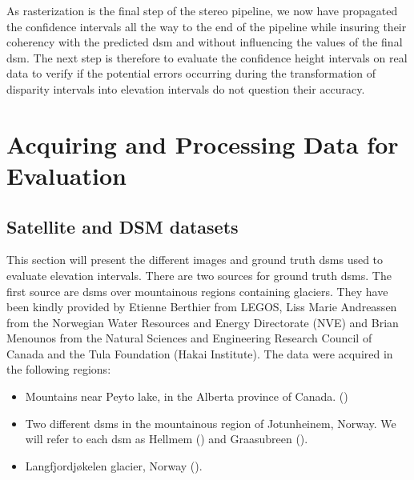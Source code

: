As rasterization is the final step of the stereo pipeline, we now have propagated the confidence intervals all the way to the end of the pipeline while insuring their coherency with the predicted \acrshort{dsm} and without influencing the values of the final \acrshort{dsm}. The next step is therefore to evaluate the confidence height intervals on real data to verify if the potential errors occurring during the transformation of disparity intervals into elevation intervals do not question their accuracy.

\section{Acquiring and Processing Data for Evaluation}
\subsection{Satellite and DSM datasets}
This section will present the different images and ground truth \acrshort{dsm}s used to evaluate elevation intervals. There are two sources for ground truth \acrshort{dsm}s. The first source are \acrshort{dsm}s over mountainous regions containing glaciers. They have been kindly provided by Etienne Berthier from LEGOS, Liss Marie Andreassen from the Norwegian Water Resources and Energy Directorate (NVE) and Brian Menounos from the Natural Sciences and Engineering Research Council of Canada and the Tula Foundation (Hakai Institute). The data were acquired in the following regions:
\begin{itemize}
    \item Mountains near Peyto lake, in the Alberta province of Canada. ()
    \item Two different \acrshort{dsm}s in the mountainous region of Jotunheinem, Norway. We will refer to each \acrshort{dsm} as Hellmem () and Graasubreen ().
    \item Langfjordjøkelen glacier, Norway ().
\end{itemize}
